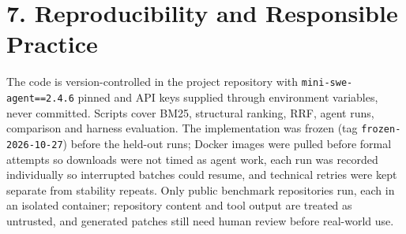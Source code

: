 \section*{7. Reproducibility and Responsible Practice}

The code is version-controlled in the project repository with \texttt{mini-swe-agent==2.4.6} pinned and API keys supplied through environment variables, never committed. Scripts cover BM25, structural ranking, RRF, agent runs, comparison and harness evaluation. The implementation was frozen (tag \texttt{frozen-2026-10-27}) before the held-out runs; Docker images were pulled before formal attempts so downloads were not timed as agent work, each run was recorded individually so interrupted batches could resume, and technical retries were kept separate from stability repeats.
Only public benchmark repositories run, each in an isolated container; repository content and tool output are treated as untrusted, and generated patches still need human review before real-world use.

